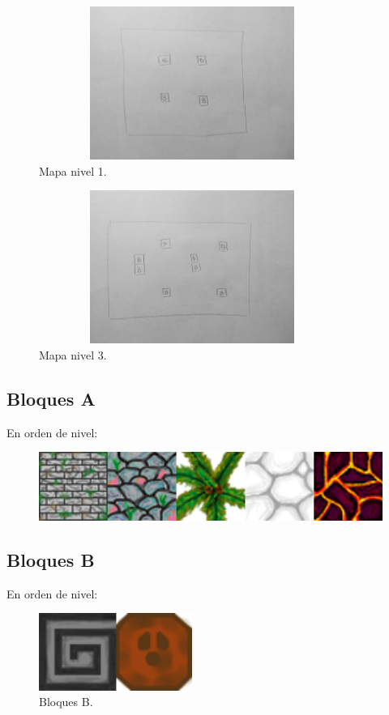 \documentclass{article}
\begin{document}
\begin{figure}[h]
\includegraphics[width=10cm, height=5cm]{imagenes/mapa1.jpg}
\centering
\caption{Mapa nivel 1.}
\end{figure}

\begin{figure}[h]
\includegraphics[width=10cm, height=5cm]{imagenes/mapa3.jpg}
\centering
\caption{Mapa nivel 3.}
\end{figure}

\newpage
\subsection{Bloques A}
\par En orden de nivel:
\begin{figure}
\includegraphics[width=12cm]{imagenes/bloquesa.png}
\centering
\end{figure}

\subsection{Bloques B}
\par En orden de nivel:
\begin{figure}[h]
\includegraphics[width=5cm]{imagenes/bloquesb.png}
\centering
\caption{Bloques B.}
\end{figure}
\end{document}
